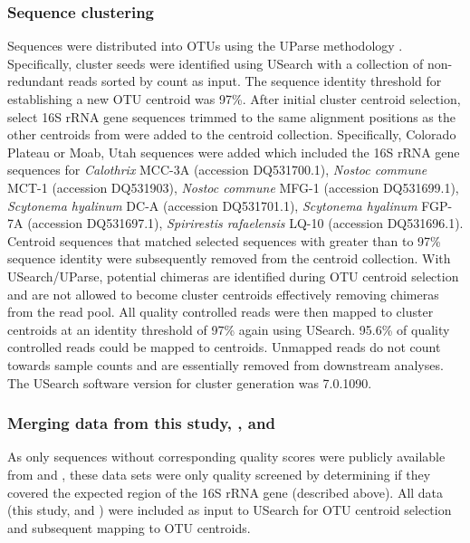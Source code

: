 \subsubsection{Sequence clustering}
Sequences were distributed into OTUs using the UParse methodology
\citep{23955772}. Specifically, cluster seeds were identified using USearch with
a collection of non-redundant reads sorted by count as input. The sequence
identity threshold for establishing a new OTU centroid was 97\%. After initial
cluster centroid selection, select 16S rRNA gene sequences trimmed to the same
alignment positions as the other centroids from \citet{Yeager} were added to
the centroid collection. Specifically, \citet{Yeager} Colorado Plateau or Moab,
Utah sequences were added which included the 16S rRNA gene sequences for
\textit{Calothrix} MCC-3A (accession DQ531700.1), \textit{Nostoc commune}
MCT-1 (accession DQ531903), \textit{Nostoc commune} MFG-1 (accession
DQ531699.1), \textit{Scytonema hyalinum} DC-A (accession DQ531701.1),
\textit{Scytonema hyalinum} FGP-7A (accession DQ531697.1), \textit{Spirirestis
rafaelensis} LQ-10 (accession DQ531696.1).  Centroid sequences that matched
selected \citet{Yeager} sequences with greater than to 97\% sequence identity
were subsequently removed from the centroid collection. With USearch/UParse,
potential chimeras are identified during OTU centroid selection and are not
allowed to become cluster centroids effectively removing chimeras from the read
pool. All quality controlled reads were then mapped to cluster centroids at an
identity threshold of 97\% again using USearch. 95.6\% of quality controlled
reads could be mapped to centroids. Unmapped reads do not count towards sample
counts and are essentially removed from downstream analyses. The USearch
software version for cluster generation was 7.0.1090.
\subsubsection{Merging data from this study, \citet{Garcia_Pichel_2013}, and
\citet{Steven_2013}} As only sequences without corresponding quality scores
were publicly available from \citet{Garcia_Pichel_2013} and
\citet{Steven_2013}, these data sets were only quality screened by determining
if they covered the expected region of the 16S rRNA gene (described above). All data
(this study, \citet{Garcia_Pichel_2013} and \citet{Steven_2013}) were included
as input to USearch for OTU centroid selection and subsequent mapping to OTU
centroids. 
